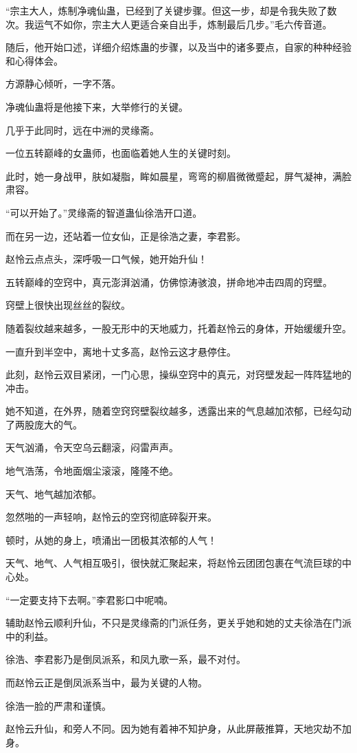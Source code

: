 \begin{this_body}
“宗主大人，炼制净魂仙蛊，已经到了关键步骤。但这一步，却是令我失败了数次。我运气不如你，宗主大人更适合亲自出手，炼制最后几步。”毛六传音道。

随后，他开始口述，详细介绍炼蛊的步骤，以及当中的诸多要点，自家的种种经验和心得体会。

方源静心倾听，一字不落。

净魂仙蛊将是他接下来，大举修行的关键。

几乎于此同时，远在中洲的灵缘斋。

一位五转巅峰的女蛊师，也面临着她人生的关键时刻。

此时，她一身战甲，肤如凝脂，眸如晨星，弯弯的柳眉微微蹙起，屏气凝神，满脸肃容。

“可以开始了。”灵缘斋的智道蛊仙徐浩开口道。

而在另一边，还站着一位女仙，正是徐浩之妻，李君影。

赵怜云点点头，深呼吸一口气候，她开始升仙！

五转巅峰的空窍中，真元澎湃汹涌，仿佛惊涛骇浪，拼命地冲击四周的窍壁。

窍壁上很快出现丝丝的裂纹。

随着裂纹越来越多，一股无形中的天地威力，托着赵怜云的身体，开始缓缓升空。

一直升到半空中，离地十丈多高，赵怜云这才悬停住。

此刻，赵怜云双目紧闭，一门心思，操纵空窍中的真元，对窍壁发起一阵阵猛地的冲击。

她不知道，在外界，随着空窍窍壁裂纹越多，透露出来的气息越加浓郁，已经勾动了两股庞大的气。

天气汹涌，令天空乌云翻滚，闷雷声声。

地气浩荡，令地面烟尘滚滚，隆隆不绝。

天气、地气越加浓郁。

忽然啪的一声轻响，赵怜云的空窍彻底碎裂开来。

顿时，从她的身上，喷涌出一团极其浓郁的人气！

天气、地气、人气相互吸引，很快就汇聚起来，将赵怜云团团包裹在气流巨球的中心处。

“一定要支持下去啊。”李君影口中呢喃。

辅助赵怜云顺利升仙，不只是灵缘斋的门派任务，更关乎她和她的丈夫徐浩在门派中的利益。

徐浩、李君影乃是倒凤派系，和凤九歌一系，最不对付。

而赵怜云正是倒凤派系当中，最为关键的人物。

徐浩一脸的严肃和谨慎。

赵怜云升仙，和旁人不同。因为她有着神不知护身，从此屏蔽推算，天地灾劫不加身。


\end{this_body}
